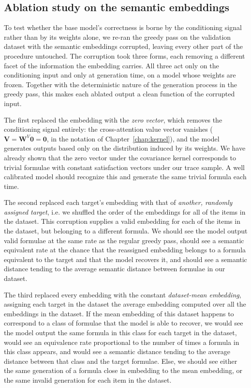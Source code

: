 \documentclass[titlepage,a4paper,11pt]{report}
\begin{document}
    \subsection{Ablation study on the semantic embeddings}\label{sec:exp1_ablation}
    To test whether the base model's correctness is borne by the conditioning signal rather than by its weights alone, we re-ran the greedy pass on the validation dataset with the semantic embeddings corrupted, leaving every other part of the procedure untouched. The corruption took three forms, each removing a different facet of the information the embedding carries. All three act only on the conditioning input and only at generation time, on a model whose weights are frozen. Together with the deterministic nature of the generation process in the greedy pass, this makes each ablated output a clean function of the corrupted input.
    
    The first replaced the embedding with the \emph{zero vector}, which removes the conditioning signal entirely: the cross-attention value vector vanishes ($\bm V = \bm W^V \bm 0 = \bm 0$, in the notation of Chapter~\ref{chap:kernel}), and the model generates outputs based only on the distribution induced by its weights. We have already shown that the zero vector under the covariance kernel corresponds to trivial formulae with constant satisfaction vectors under our trace sample. A well calibrated model should recognize this and generate the same trivial formula each time.
    
    The second replaced each target's embedding with that of \emph{another, randomly assigned target}, i.e. we shuffled the order of the embeddings for all of the items in the dataset. This corruption supplies a valid embedding for each of the items in the dataset, but belonging to a different formula. We should see the model output valid formulae at the same rate as the regular greedy pass, should see a semantic equivalent rate at the chance that the reassigned embedding belongs to a formula equivalent to the target and that the model recovers it, and should see a semantic distance tending to the average semantic distance between formulae in our dataset. 
    
    The third replaced every embedding with the constant \emph{dataset-mean embedding}, assigning each target in the dataset the average embedding computed over all the embeddings in the dataset. If the mean embedding of this dataset happens to correspond to a class of formulae that the model is able to recover, we would see the model output the same formula in this class for each target in the dataset, would see an equivalence rate proportional to the number of times a formula in this class appears, and would see a semantic distance tending to the average distance between that class and the target formulae. Else, we should see either the same generation of a formula close in embedding to the mean embedding, or the same invalid generation for each item in the dataset.
\end{document}
